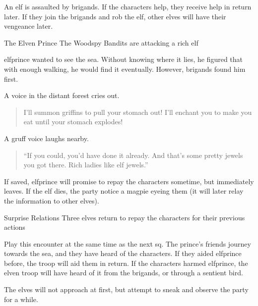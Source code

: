 \label{littleprince}

\noindent
An elf is assaulted by brigands.
If the characters help, they receive help in return later.
If they join the brigands and rob the elf, other elves will have their vengeance later.

{The Elven Prince}%
{The Woodspy Bandits are attacking a rich elf}%

\Gls{elfprince} wanted to see the sea.
Without knowing where it lies, he figured that with enough walking, he would find it eventually.
However, brigands found him first.

\begin{boxtext}
  A voice in the distant forest cries out.
  \begin{quote}
    I'll summon griffins to pull your stomach out!  I'll enchant you to make you eat until your stomach explodes!
  \end{quote}

  A gruff voice laughs nearby.

  \begin{quote}
    ``If you could, you'd have done it already.  And that's some pretty jewels you got there.  Rich ladies like elf jewels.''
  \end{quote}

\end{boxtext}


\elfprince

If saved, \gls{elfprince} will promise to repay the characters sometime, but immediately leaves.
If the elf dies, the party notice a magpie eyeing them (it will later relay the information to other elves).

{\squash Surprise Relations}%
{Three elves return to repay the characters for their previous actions}%

Play this encounter at the same time as the next \gls{sq}.
The prince's friends journey towards the sea, and they have heard of the characters.
If they aided \gls{elfprince} before, the troop will aid them in return.
If the characters harmed \gls{elfprince}, the elven troop will have heard of it from the brigands, or through a sentient bird.

The elves will not approach at first, but attempt to sneak and observe the party for a while.

